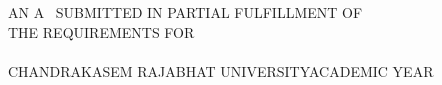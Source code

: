 %
%
%
%
{\centering
	\fontsize{16}{18.4}\selectfont
	\bfseries\expandafter\uppercase\expandafter{\@thesistitle}\\\vspace{1.427465\baselineskip}\ \\
	\fontsize{14}{16.1}\selectfont\bfseries
	
	\vspace{1.427465\baselineskip}
	\expandafter\uppercase\expandafter{\@author}
	\vfill
	
	\fontsize{13.1}{16.1}\selectfont
	\ifx\@typeofwriting\IndStudy AN	\else A	\fi 
	\expandafter\uppercase\expandafter{\@typeofwriting}\ SUBMITTED IN PARTIAL FULFILLMENT OF\\
	THE REQUIREMENTS FOR \ifdefined\@researchsubject \expandafter\uppercase\expandafter{\@researchsubject} \fi \\
	
	\ifdefined\@degree \expandafter\uppercase\expandafter{\@degree} \fi
	\ifdefined\@major \expandafter\uppercase\expandafter{\@major} \fi
	\ifdefined\@faculty \expandafter\uppercase\expandafter{\@faculty} \fi \\
	

	
	CHANDRAKASEM RAJABHAT UNIVERSITY\space\space ACADEMIC YEAR \advance{} \the\year
	\par}


